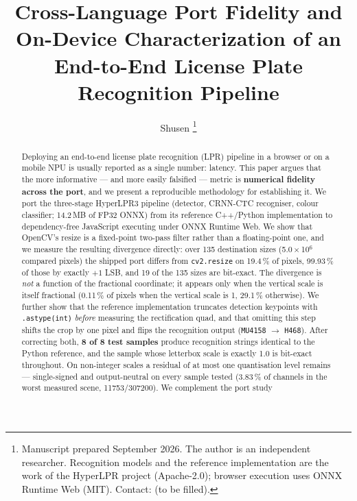 \documentclass[journal]{IEEEtran}
\begin{document}
\title{Cross-Language Port Fidelity and On-Device Characterization of an
End-to-End License Plate Recognition Pipeline}

\author{Shusen%
\thanks{Manuscript prepared September 2026. The author is an independent
researcher. Recognition models and the reference implementation are the work of
the HyperLPR project (Apache-2.0); browser execution uses ONNX Runtime Web (MIT).
Contact: (to be filled).}}

\maketitle

\begin{abstract}
Deploying an end-to-end license plate recognition (LPR) pipeline in a browser or
on a mobile NPU is usually reported as a single number: latency. This paper
argues that the more informative --- and more easily falsified --- metric is
\textbf{numerical fidelity across the port}, and we present a reproducible
methodology for establishing it. We port the three-stage HyperLPR3 pipeline
(detector, CRNN-CTC recogniser, colour classifier; 14.2\,MB of FP32 ONNX) from
its reference C++/Python implementation to dependency-free JavaScript executing
under ONNX Runtime Web. We show that OpenCV's  resize is a
fixed-point two-pass filter rather than a floating-point one, and we measure the
resulting divergence directly: over 135 destination sizes (5.0\,$\times$\,10$^6$
compared pixels) the shipped port differs from \texttt{cv2.resize} on 19.4\,\% of
pixels, 99.93\,\% of those by exactly $+1$ LSB, and 19 of the 135 sizes are
bit-exact. The divergence is \emph{not} a function of the fractional coordinate;
it appears only when the vertical scale is itself fractional (0.11\,\% of pixels
when the vertical scale is 1, 29.1\,\% otherwise). We further show that the
reference implementation truncates detection keypoints with
\texttt{.astype(int)} \emph{before} measuring the rectification quad, and that
omitting this step shifts the crop by one pixel and flips the recognition output
(\texttt{MU4158} $\rightarrow$ \texttt{H468}). After correcting both, \textbf{8
of 8 test samples} produce recognition strings identical to the Python
reference, and the sample whose letterbox scale is exactly 1.0 is bit-exact
throughout. On non-integer scales a residual of at most one quantisation level
remains --- single-signed and output-neutral on every sample tested (3.83\,\% of
channels in the worst measured scene, 11753/307200). We complement the port study

\end{abstract}
\end{document}
